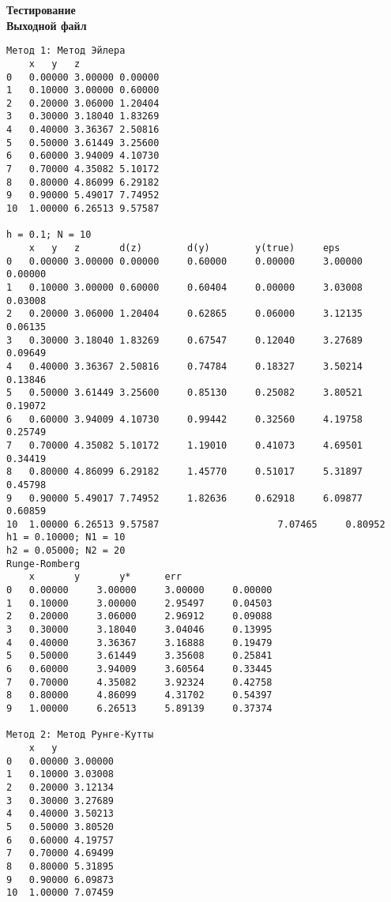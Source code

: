 \textbf{Тестирование}\\

\textbf{Выходной файл}
\begin{verbatim}
Метод 1: Метод Эйлера
	x	y	z
0	0.00000	3.00000	0.00000
1	0.10000	3.00000	0.60000
2	0.20000	3.06000	1.20404
3	0.30000	3.18040	1.83269
4	0.40000	3.36367	2.50816
5	0.50000	3.61449	3.25600
6	0.60000	3.94009	4.10730
7	0.70000	4.35082	5.10172
8	0.80000	4.86099	6.29182
9	0.90000	5.49017	7.74952
10	1.00000	6.26513	9.57587

h = 0.1; N = 10
	x	y	z		d(z)		d(y)		y(true)		eps
0	0.00000	3.00000	0.00000		0.60000		0.00000		3.00000		0.00000
1	0.10000	3.00000	0.60000		0.60404		0.00000		3.03008		0.03008
2	0.20000	3.06000	1.20404		0.62865		0.06000		3.12135		0.06135
3	0.30000	3.18040	1.83269		0.67547		0.12040		3.27689		0.09649
4	0.40000	3.36367	2.50816		0.74784		0.18327		3.50214		0.13846
5	0.50000	3.61449	3.25600		0.85130		0.25082		3.80521		0.19072
6	0.60000	3.94009	4.10730		0.99442		0.32560		4.19758		0.25749
7	0.70000	4.35082	5.10172		1.19010		0.41073		4.69501		0.34419
8	0.80000	4.86099	6.29182		1.45770		0.51017		5.31897		0.45798
9	0.90000	5.49017	7.74952		1.82636		0.62918		6.09877		0.60859
10	1.00000	6.26513	9.57587						7.07465		0.80952
h1 = 0.10000; N1 = 10
h2 = 0.05000; N2 = 20
Runge-Romberg
	x		y		y*		err
0	0.00000		3.00000		3.00000		0.00000
1	0.10000		3.00000		2.95497		0.04503
2	0.20000		3.06000		2.96912		0.09088
3	0.30000		3.18040		3.04046		0.13995
4	0.40000		3.36367		3.16888		0.19479
5	0.50000		3.61449		3.35608		0.25841
6	0.60000		3.94009		3.60564		0.33445
7	0.70000		4.35082		3.92324		0.42758
8	0.80000		4.86099		4.31702		0.54397
9	1.00000		6.26513		5.89139		0.37374

Метод 2: Метод Рунге-Кутты
	x	y
0	0.00000	3.00000
1	0.10000	3.03008
2	0.20000	3.12134
3	0.30000	3.27689
4	0.40000	3.50213
5	0.50000	3.80520
6	0.60000	4.19757
7	0.70000	4.69499
8	0.80000	5.31895
9	0.90000	6.09873
10	1.00000	7.07459


\end{verbatim}

